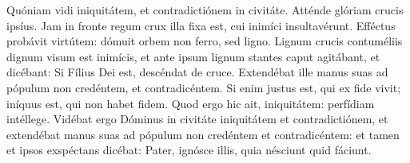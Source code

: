 

    Quóniam vidi iniquitátem, et contradictiónem in
    civitáte. Atténde glóriam crucis ipsíus. Jam in fronte regum crux illa fixa
    est, cui inimíci insultavérunt. Efféctus probávit virtútem: dómuit orbem
    non ferro, sed ligno. Lignum crucis contuméliis dignum visum est inimícis,
    et ante ipsum lignum stantes caput agitábant, et dicébant: Si Fílius Dei
    est, descéndat de cruce. Extendébat ille manus suas ad pópulum non
    credéntem, et contradicéntem. Si enim justus est, qui ex fide vivit;
    iníquus est, qui non habet fidem. Quod ergo hic ait, iniquitátem: perfídiam
    intéllege. Vidébat ergo Dóminus in civitáte iniquitátem et contradictiónem,
    et extendébat manus suas ad pópulum non credéntem et contradicéntem: et
    tamen et ipsos exspéctans dicébat: Pater, ignósce illis, quia nésciunt quid
    fáciunt.

